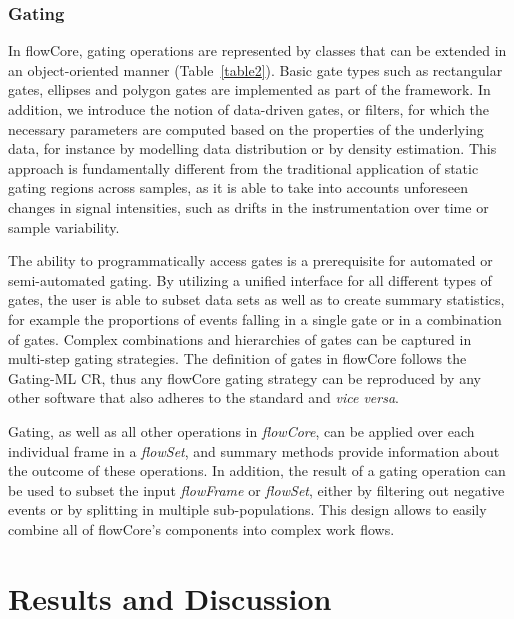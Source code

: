 \documentclass[10pt]{bmc_article}
\newcommand{\Rpackage}[1]{{\textsf{#1}}}
\newcommand{\Rclass}[1]{{\textit{#1}}}
\newenvironment{bmcformat}{\begin{raggedright}\baselineskip20pt\sloppy\setboolean{publ}{false}}{\end{raggedright}\baselineskip20pt\sloppy}
\begin{document}
\begin{bmcformat}
\subsubsection*{Gating}
In \Rpackage{flowCore}, gating operations are represented by classes
that can be extended in an object-oriented manner
(Table~\ref{table2}). Basic gate types such as rectangular gates,
ellipses and polygon gates are implemented as part of the
framework. In addition, we introduce the notion of data-driven gates,
or filters, for which the necessary parameters are computed based on
the properties of the underlying data, for instance by modelling data
distribution or by density estimation. This approach is fundamentally
different from the traditional application of static gating regions
across samples, as it is able to take into accounts unforeseen changes
in signal intensities, such as drifts in the instrumentation
over time or sample variability.

The ability to programmatically access gates is a prerequisite for
automated or semi-automated gating. By utilizing a unified interface
for all different types of gates, the user is able to subset data sets
as well as to create summary statistics, for example the proportions
of events falling in a single gate or in a combination of
gates. Complex combinations and hierarchies of gates can be captured
in multi-step gating strategies. The definition of gates in
\Rpackage{flowCore} follows the Gating-ML CR, thus any
\Rpackage{flowCore} gating strategy can be reproduced by any other
software that also adheres to the standard and \textit{vice versa}.

Gating, as well as all other operations in \Rclass{flowCore}, can be
applied over each individual frame in a \Rclass{flowSet}, and summary
methods provide information about the outcome of these operations. In
addition, the result of a gating operation can be used to subset the
input \Rclass{flowFrame} or \Rclass{flowSet}, either by filtering out
negative events or by splitting in multiple sub-populations. This
design allows to easily combine all of \Rpackage{flowCore}'s
components into complex work flows.

\section*{Results and Discussion}

\end{bmcformat}
\end{document}
